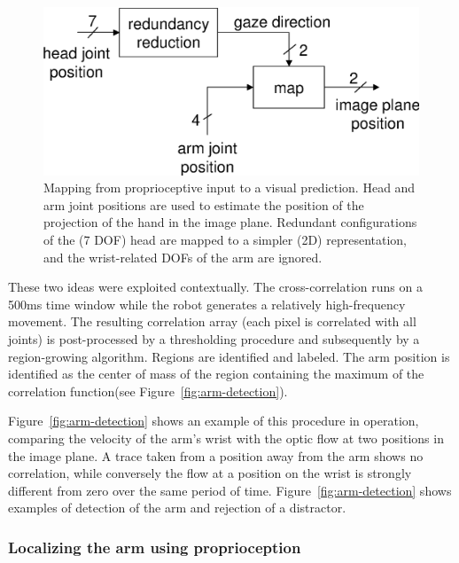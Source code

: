 \ifverbose
\begin{figure}[tb]
\begin{center}
\includegraphics[width=\columnwidth]{mapping-reach.eps}
\caption{ 
%
Mapping from proprioceptive input to a visual prediction. Head and arm
joint positions are used to estimate the position of the projection of
the hand in the image plane.  Redundant configurations of the (7 DOF)
head are mapped to a simpler (2D) representation, and the wrist-related 
DOFs of the arm are ignored.
%
}
\label{fig:mapping-reach}
\end{center}
\end{figure}
\endif
\fi

\ifverbose
These two ideas were exploited contextually. The cross-correlation
runs on a 500ms time window while the robot generates a relatively
high-frequency movement. The resulting correlation array (each pixel
is correlated with all joints) is post-processed by a thresholding
procedure and subsequently by a region-growing algorithm. Regions are
identified and labeled. The arm position is identified as the center
of mass of the region containing the maximum of the correlation
function\iflong (see Figure~\ref{fig:arm-detection})\fi.
\fi

Figure~\ref{fig:arm-detection} shows an example of this procedure
in operation, comparing the velocity of the arm's wrist with the optic
flow at two positions in the image plane.  A trace taken from a
position away from the arm shows no correlation, while conversely the
flow at a position on the wrist is strongly different from zero over
the same period of time.  Figure~\ref{fig:arm-detection} shows
examples of detection of the arm and rejection of a distractor.


\subsubsection*{Localizing the arm using proprioception}

